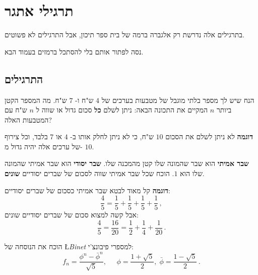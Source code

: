 
\appendix

\chapter[תרגילי אתגר]{%
\vspace*{-2ex}
תרגילי אתגר%
}\label{a.challenge}

\vspace*{-4ex}

בתרגילים אלה נדרשת רק אלגברה ברמה של בית ספר תיכון, אבל התרגילים לא פשוטים.

נסה לפתור אותם בלי להסתכל ברמזים בעמוד הבא.

\section{%
התרגילים%
}

\begin{exercise}\label{e.coins}
הנח שיש לך מספר בלתי מוגבל של מטבעות בערכים של
$4$
ש"ח ו-%
$7$
ש"ח. מה המספר הקטן ביותר
$n$
המקיים את התכונה הבאה: ניתן לשלם
\textbf{כל}
סכום גדול או שווה ל
$n$
ש"ח עם המטבעות האלה?
\end{exercise}

\textbf{דוגמה}
לא ניתן לשלם את הסכום
$10$
ש"ח, כי לא ניתן לחלק אותו ב-%
$4$
או
$7$
בלבד, וכל צירוף של ערכים אלה יהיה גדול מ-%
$10$.

\begin{exercise}\label{e.proper}
\textbf{שבר אמיתי}
הוא שבר שהמונה שלו קטן מהמכנה שלו. 
\textbf{שבר יסודי}
הוא שבר אמיתי שהמונה שלו הוא
$1$.
הוכח שכל שבר אמיתי שווה לסכום של שברים יסודיים
\textbf{שונים}.
\end{exercise}


\textbf{דוגמה}
קל מאוד לבטא שבר אמיתי כסכום של שברים יסודיים:
\[
\frac{4}{5} = \frac{1}{5} + \frac{1}{5} + \frac{1}{5} + \frac{1}{5}\,,
\]
אבל קשה למצוא סכום של שברים יסודיים שונים:
\[
\frac{4}{5} = \frac{16}{20} = \frac{1}{2} + \frac{1}{4} + \frac{1}{20}\,.
\]

\vspace*{-1ex}

\begin{exercise}\label{e.binet}
הוכח את הנוסחה של
\L{\emph{Binet}}
למספרי פיבונצ'י:
\begin{displaymath}
f_n = \frac{\phi^n - \bar{\phi}^n}{\sqrt{5}}, \;\;\;\;\;
\phi = \frac{1+\sqrt{5}}{2},\;\bar{\phi} = \frac{1-\sqrt{5}}{2}\,.
\end{displaymath}
\end{exercise}

